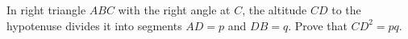 In right triangle $ABC$ with the right angle at $C$, the altitude $CD$ to the hypotenuse divides it into segments $AD=p$ and $DB=q$. Prove that $CD^2=pq$.

